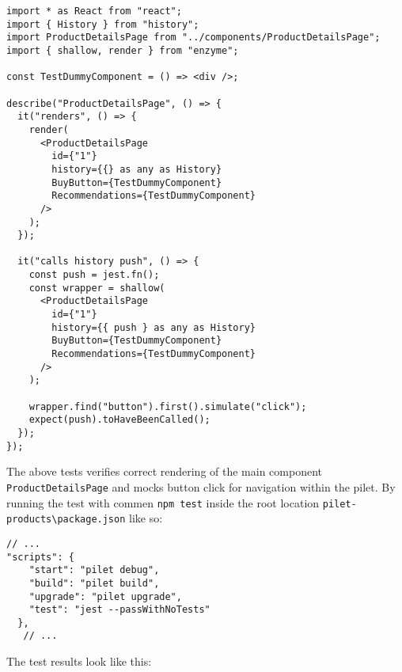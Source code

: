 \documentclass[a4paper]{book}
\begin{document}
\begin{lstlisting}[caption={ProductDetailsPage.test.tsx}]
  import * as React from "react";
import { History } from "history";
import ProductDetailsPage from "../components/ProductDetailsPage";
import { shallow, render } from "enzyme";

const TestDummyComponent = () => <div />;

describe("ProductDetailsPage", () => {
  it("renders", () => {
    render(
      <ProductDetailsPage
        id={"1"}
        history={{} as any as History}
        BuyButton={TestDummyComponent}
        Recommendations={TestDummyComponent}
      />
    );
  });

  it("calls history push", () => {
    const push = jest.fn();
    const wrapper = shallow(
      <ProductDetailsPage
        id={"1"}
        history={{ push } as any as History}
        BuyButton={TestDummyComponent}
        Recommendations={TestDummyComponent}
      />
    );

    wrapper.find("button").first().simulate("click");
    expect(push).toHaveBeenCalled();
  });
});
\end{lstlisting}

The above tests verifies correct rendering of the main component \verb|ProductDetailsPage| and mocks button click for navigation within the pilet. By running the test with commen \verb|npm test| inside the root location \verb|pilet-products\package.json| like so:

\begin{lstlisting}[caption={pilet-products package.json file}]
 // ...
"scripts": {
    "start": "pilet debug",
    "build": "pilet build",
    "upgrade": "pilet upgrade",
    "test": "jest --passWithNoTests"
  },
   // ...
\end{lstlisting}

The test results look like this:
\end{document}

